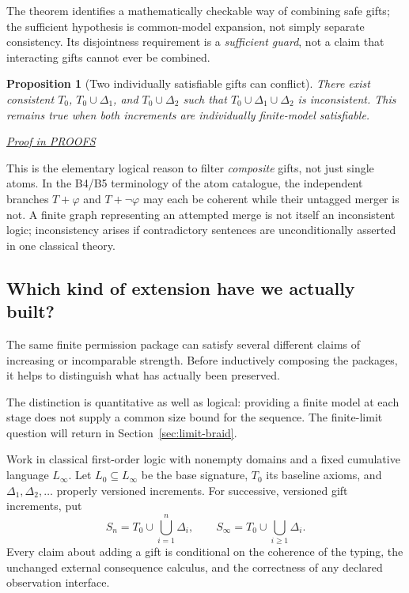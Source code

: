 \documentclass[11pt,letterpaper]{article}
\newtheorem{proposition}[theorem]{Proposition}
\theoremstyle{definition}\newtheorem{definition}[theorem]{Definition}\newtheorem{example}[theorem]{Example}
\theoremstyle{remark}\newtheorem{remark}[theorem]{Remark}
\newcommand{\prooflink}[1]{\par\noindent\hfill\small\hyperref[#1]{\textit{Proof in PROOFS}}\normalsize}
\begin{document}
The theorem identifies a mathematically checkable way of combining safe gifts; the sufficient hypothesis is common-model expansion, not simply separate consistency. Its disjointness requirement is a \emph{sufficient guard}, not a claim that interacting gifts cannot ever be combined.

\begin{proposition}[Two individually satisfiable gifts can conflict]\label{w1:prop:conflict}
There exist consistent $T_0$, $T_0\cup\Delta_1$, and $T_0\cup\Delta_2$ such that $T_0\cup\Delta_1\cup\Delta_2$ is inconsistent. This remains true when both increments are individually finite-model satisfiable.
\prooflink{w1:pr:conflict}
\end{proposition}

This is the elementary logical reason to filter \emph{composite} gifts, not just single atoms. In the B4/B5 terminology of the atom catalogue, the independent branches $T+\varphi$ and $T+\neg\varphi$ may each be coherent while their untagged merger is not. A finite graph representing an attempted merge is not itself an inconsistent logic; inconsistency arises if contradictory sentences are unconditionally asserted in one classical theory.


\subsection{Which kind of extension have we actually built?}\label{sec:model-strength}
The same finite permission package can satisfy several different claims of
increasing or incomparable strength. Before inductively composing the
packages, it helps to distinguish what has actually been preserved.

The distinction is quantitative as well as logical: providing a finite
model at each stage does not supply a common size bound for the sequence.
The finite-limit question will return in Section~\ref{sec:limit-braid}.

Work in classical first-order logic with nonempty domains and a fixed cumulative language $L_\infty$. Let $L_0\subseteq L_\infty$ be the base signature, $T_0$ its baseline axioms, and $\Delta_1,\Delta_2,\dots$ properly versioned increments. For successive, versioned gift increments, put
\[
 S_n=T_0\cup\bigcup_{i=1}^n\Delta_i,\qquad S_\infty=T_0\cup\bigcup_{i\ge1}\Delta_i.
\]
Every claim about adding a gift is conditional on the coherence of the typing, the unchanged external consequence calculus, and the correctness of any declared observation interface.
\end{document}
